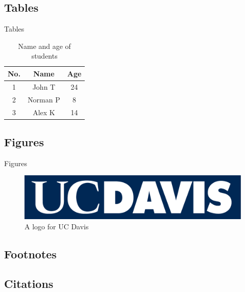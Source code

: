 \documentclass{beamer}
\begin{document}
    \subsection{Tables}

    \begin{frame}{Tables}

    \begin{table}
    \begin{tabular}{| c || c | c |}
        \hline
        No. & Name & Age \\
        \hline \hline
        1 & John T & 24 \\
        2 & Norman P & 8 \\
        3 & Alex K & 14 \\ 
        \hline
    \end{tabular}
    \caption{Name and age of students}
    \end{table}

    \end{frame}

    \subsection{Figures}

    \begin{frame}{Figures}
    \begin{figure}
        \includegraphics[width=0.8\linewidth]{Theme/Logos/DavisLogoV3.png}
        \caption{A logo for UC Davis}
    \end{figure}
    \end{frame}

    \subsection{Footnotes}


    \subsection{Citations}
\end{document}
